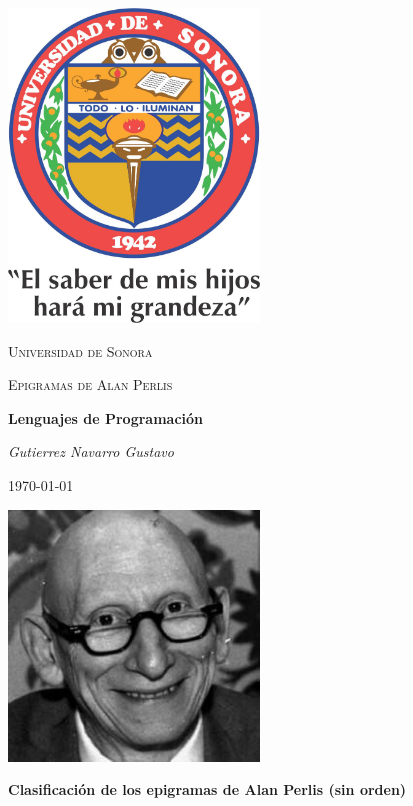 \documentclass{article}
\begin{document}
\begin{titlepage}
	\centering
	\includegraphics[width=0.5\textwidth]{unisonlogo.jpg}\par\vspace{1cm}
	{\scshape\LARGE Universidad de Sonora\par}
	\vspace{1cm}
	{\scshape\Large Epigramas de Alan Perlis\par}
	\vspace{1.5cm}
	{\huge\bfseries Lenguajes de Programación\par}
	\vspace{2cm}
	{\Large\itshape Gutierrez Navarro Gustavo\par}
	\vfill
	\vfill
	{\large \today\par}
\end{titlepage}
\begin{center}
    \includegraphics[width=0.5\textwidth]{alan.png}\par\vspace{1cm}
    \huge\textbf{Clasificación de los epigramas de Alan Perlis (sin orden)}
\end{center}
\end{document}
